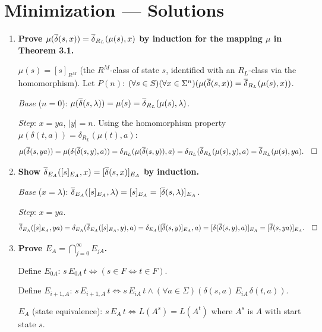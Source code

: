 \chapter{Minimization --- Solutions}

\begin{enumerate}[{3.}1.]

\item \textbf{Prove $\mu(\overline{\delta}(s,x))=\overline{\delta}_{R_L}(\mu(s),x)$ by induction for the mapping $\mu$ in Theorem 3.1.}

$\mu(s)=[s]_{R^M}$ (the $R^M$-class of state $s$, identified with an $R_L$-class via the homomorphism). Let $P(n)$: $(\forall s\in S)(\forall x\in\Sigma^n)(\mu(\overline{\delta}(s,x))=\overline{\delta}_{R_L}(\mu(s),x))$.

\textit{Base} ($n=0$): $\mu(\overline{\delta}(s,\lambda))=\mu(s)=\overline{\delta}_{R_L}(\mu(s),\lambda)$. \checkmark

\textit{Step}: $x=ya$, $|y|=n$. Using the homomorphism property $\mu(\delta(t,a))=\delta_{R_L}(\mu(t),a)$:
\[
\mu(\overline{\delta}(s,ya))=\mu(\delta(\overline{\delta}(s,y),a))=\delta_{R_L}(\mu(\overline{\delta}(s,y)),a)=\delta_{R_L}(\overline{\delta}_{R_L}(\mu(s),y),a)=\overline{\delta}_{R_L}(\mu(s),ya). \quad\square
\]

\item \textbf{Show $\overline{\delta}_{E_A}([s]_{E_A},x)=[\overline{\delta}(s,x)]_{E_A}$ by induction.}

\textit{Base} ($x=\lambda$): $\overline{\delta}_{E_A}([s]_{E_A},\lambda)=[s]_{E_A}=[\overline{\delta}(s,\lambda)]_{E_A}$. \checkmark

\textit{Step}: $x=ya$.
\[
\overline{\delta}_{E_A}([s]_{E_A},ya)=\delta_{E_A}(\overline{\delta}_{E_A}([s]_{E_A},y),a)=\delta_{E_A}([\overline{\delta}(s,y)]_{E_A},a)=[\delta(\overline{\delta}(s,y),a)]_{E_A}=[\overline{\delta}(s,ya)]_{E_A}. \quad\square
\]

\item \textbf{Prove $E_A=\bigcap_{j=0}^\infty E_{jA}$.}

Define $E_{0A}$: $s\,E_{0A}\,t\Leftrightarrow(s\in F\Leftrightarrow t\in F)$.

Define $E_{i+1,A}$: $s\,E_{i+1,A}\,t\Leftrightarrow s\,E_{iA}\,t\wedge(\forall a\in\Sigma)(\delta(s,a)\,E_{iA}\,\delta(t,a))$.

$E_A$ (state equivalence): $s\,E_A\,t\Leftrightarrow L(A^s)=L(A^t)$ where $A^s$ is $A$ with start state $s$.


\end{enumerate}
